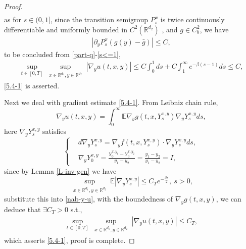 \documentclass[11pt,reqno]{amsart}
\numberwithin{equation}{section}
\newcommand{\mb}{\mathbb}
\begin{document}
\begin{proof}
\begin{align}
\end{align}
as for $s\in(0,1]$, since the transition semigroup $P^{x}_{s}$ is twice continuously differentiable and  uniformly bounded in $C^{2}(\mb{R}^{d_{2}})$ \cite[743, Theorem 3.1; 749, Proposition 3.4]{VK}, and $g\in C_b^{2}$,  we have
\begin{align}\label{s<=1}
	\left|\partial_{y}P_{s}^{x}\left(g(y)-\bar{g}\right) \right|\leq  C,
	\end{align}
to be concluded from \eqref{part-q}-\eqref{s<=1},
\begin{align*}
\sup_{t\in [0,T]} \sup_{\substack{x\in \mathbb{R}^{d_{1}}, y\in \mathbb{R}^{d_{2}}}}|\nabla_{y}u(t,x,y)| \leq  C\int_{0}^{1}ds+C\int_{1}^{\infty}e^{-\beta (s-1)}ds\leq C,
\end{align*}
\eqref{5.4-1} is asserted.
\fi


Next we deal with gradient estimate \eqref{5.4-1}. From Leibniz chain rule,
\begin{equation}\label{nab-y-u}
		\nabla_{y}u(t,x,y)= \int_{0}^{\infty}\mathbb{E}\nabla_{y}g(t,x,Y_{s}^{x,y})\nabla_{y}Y_{s}^{x,y}ds,
\end{equation}
here $ \nabla_{y}Y_{s}^{x,y}$ satisfies
\begin{equation}
	\left\{
	\begin{aligned}
		&d\nabla_{y}Y_{s}^{x,y}= \nabla_{y}f(t,x,Y_{s}^{x,y})\cdot \nabla_{y}Y_{s}^{x,y}ds,\\
		&\nabla_{y}Y_{0}^{x,y}=\frac{Y_{0}^{x,y_{1}}-Y_{0}^{x,y_{2}}}{y_{1}-y_{2}}=\frac{y_{1}-y_{2}}{y_{1}-y_{2}}=I,
	\end{aligned}\nonumber
	\right.
\end{equation}
since by Lemma \ref{L-inv-gen} we have 
\begin{equation*}
 \sup_{\substack{x\in \mathbb{R}^{d_{1}}, y\in \mathbb{R}^{d_{2}}}}\mathbb{E}|\nabla_{y}Y_{s}^{x,y}|\leq C_{T}e^{-\frac{\beta s}{2}},\ s>0,
\end{equation*}
substitute this into \eqref{nab-y-u}, with the boundedness of $\nabla_{y}g(t,x,y)$, we can deduce that $\exists C_{T}>0 $ s.t.,
\begin{align*}
\sup_{t\in [0,T]} \sup_{\substack{x\in \mathbb{R}^{d_{1}}, y\in \mathbb{R}^{d_{2}}}}|\nabla_{y}u(t,x,y)|\leq C_{T},
\end{align*}
which asserts \eqref{5.4-1},
proof is complete.
\end{proof}
\end{document}
